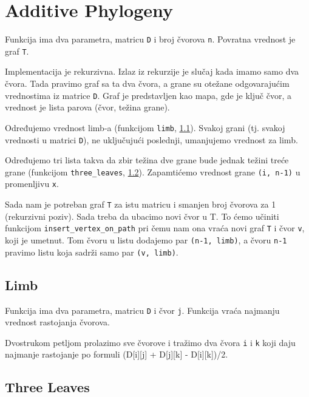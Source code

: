 \section{Additive Phylogeny}

Funkcija ima dva parametra, matricu \texttt{D} i broj čvorova \texttt{n}. Povratna vrednost je graf \texttt{T}.

Implementacija je rekurzivna. Izlaz iz rekurzije je slučaj kada imamo samo dva čvora. Tada pravimo graf sa ta dva čvora, a grane su otežane odgovarajućim vrednostima iz matrice \texttt{D}. Graf je predstavljen kao mapa, gde je ključ čvor, a vrednost je lista parova (čvor, težina grane).

Određujemo vrednost limb-a (funkcijom \texttt{limb}, \ref{limb}). Svakoj grani (tj. svakoj vrednosti u matrici \texttt{D}), ne uključujući poslednji, umanjujemo vrednost za limb.

Određujemo tri lista takva da zbir težina dve grane bude jednak težini treće grane (funkcijom \texttt{three\_leaves}, \ref{threeLeaves}). Zapamtićemo vrednost grane \texttt{(i, n-1)} u promenljivu \texttt{x}. 

Sada nam je potreban graf \texttt{T} za istu matricu i smanjen broj čvorova za 1 (rekurzivni poziv). Sada treba da ubacimo novi čvor u T. To ćemo učiniti funkcijom \texttt{insert\_vertex\_on\_path} pri čemu nam ona vraća novi graf \texttt{T} i čvor \texttt{v}, koji je umetnut. Tom čvoru u listu dodajemo par \texttt{(n-1, limb)}, a čvoru \texttt{n-1} pravimo listu koja sadrži samo par \texttt{(v, limb)}.




\subsection{Limb}
\label{limb}

Funkcija ima dva parametra, matricu \texttt{D} i čvor \texttt{j}. Funkcija vraća najmanju vrednost rastojanja čvorova.

Dvostrukom petljom prolazimo sve čvorove i tražimo dva čvora \texttt{i} i \texttt{k} koji daju najmanje rastojanje po formuli (D[i][j] + D[j][k] - D[i][k])/2.

\newpage



\subsection{Three Leaves}
\label{threeLeaves}

